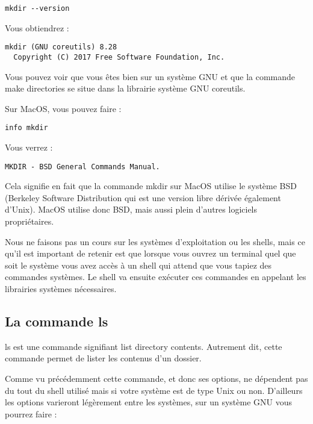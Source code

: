 \documentclass{article}
\begin{document}
\begin{verbatim}
mkdir --version
\end{verbatim}

Vous obtiendrez :
\begin{verbatim}
mkdir (GNU coreutils) 8.28
  Copyright (C) 2017 Free Software Foundation, Inc.
\end{verbatim}

Vous pouvez voir que vous êtes bien sur un système {\color{blue}GNU} et que la commande {\color{blue}make directories} se situe dans la librairie système {\color{blue}GNU coreutils}.

Sur {\color{blue}MacOS}, vous pouvez faire :

\begin{verbatim}
info mkdir
\end{verbatim}
Vous verrez : 
\begin{verbatim}
MKDIR - BSD General Commands Manual.
\end{verbatim}

Cela signifie en fait que la commande {\color{blue}mkdir} sur {\color{blue}MacOS} utilise le système {\color{blue}BSD (Berkeley Software Distribution} qui est une version libre dérivée également d'{\color{blue}Unix}). {\color{blue}MacOS} utilise donc {\color{blue}BSD}, mais aussi plein d'autres logiciels propriétaires.

Nous ne faisons pas un cours sur les systèmes d'exploitation ou les {\color{blue}shells}, mais ce qu'il est important de retenir est que lorsque vous ouvrez un terminal quel que soit le système vous avez accès à un {\color{blue}shell} qui attend que vous tapiez des commandes systèmes. Le {\color{blue}shell} va ensuite exécuter ces commandes en appelant les librairies systèmes nécessaires.

\subsection{La commande {\color{blue}ls}}
{\color{blue}ls} est une commande signifiant {\color{blue}list directory contents}. Autrement dit, cette commande permet de lister les contenus d'un dossier.

Comme vu précédemment cette commande, et donc ses options, ne dépendent pas du tout du {\color{blue}shell} utilisé mais si votre système est de type {\color{blue}Unix} ou non. D'ailleurs les options varieront légèrement entre les systèmes, sur un système {\color{blue}GNU} vous pourrez faire :
\end{document}
